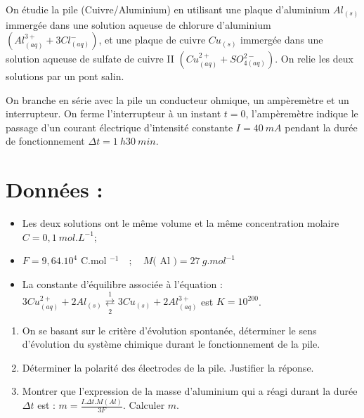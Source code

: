 On étudie la pile (Cuivre/Aluminium) en utilisant une plaque d'aluminium $A l_{(s)}$ immergée dans une solution aqueuse de chlorure d'aluminium $\left(A l_{(a q)}^{3+}+3 C l_{(a q)}^{-}\right)$, et une plaque de cuivre $C u_{(s)}$ immergée dans une solution aqueuse de sulfate de cuivre II $\left(Cu_{(a q)}^{2+}+SO_{4(a q)}^{2-}\right)$. On relie les deux solutions par un pont salin.

On branche en série avec la pile un conducteur ohmique, un ampèremètre et un interrupteur. On ferme l'interrupteur à un instant $t=0$, l'ampèremètre indique le passage d'un courant électrique d'intensité constante $I=40 ~mA$ pendant la durée de fonctionnement $\Delta t=1 ~h 30 ~min$.

\section*{Données :}
\begin{itemize}
  \item Les deux solutions ont le même volume et la même concentration molaire $C=0,1 ~mol . L^{-1}$;
  \item $F=9,64.10^{4}$ C.mol $^{-1} \quad ; \quad M($ Al $)=27 ~g . mol^{-1}$
  \item La constante d'équilibre associée à l'équation : $3 C u_{(a q)}^{2+}+2 A l_{(s)} \underset{2}{\stackrel{1}{\rightleftarrows}} 3 C u_{(s)}+2 A l_{(a q)}^{3+}$ est $K=10^{200}$.
\end{itemize}

\begin{enumerate}
  \item On se basant sur le critère d'évolution spontanée, déterminer le sens d'évolution du système chimique durant le fonctionnement de la pile.
  \item Déterminer la polarité des électrodes de la pile. Justifier la réponse.
  \item Montrer que l'expression de la masse d'aluminium qui a réagi durant la durée $\Delta t$ est : $m=\frac{I . \Delta t . M(A l)}{3 F}$. Calculer $m$.
\end{enumerate}



